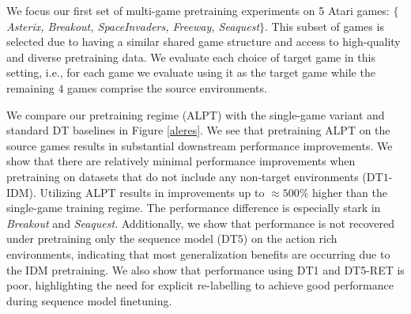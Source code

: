 \documentclass{article} %
\begin{document}



We focus our first set of multi-game pretraining experiments on 5 Atari games: $\{$\emph{Asterix, Breakout, SpaceInvaders, Freeway, Seaquest}$\}$. 
This subset of games is selected due to having a similar shared game structure and access to high-quality and diverse pretraining data.  
We evaluate each choice of target game in this setting, i.e., for each game we evaluate using it as the target game while the remaining $4$ games comprise the source environments.

We compare our pretraining regime (ALPT) with the single-game variant and standard DT baselines in Figure \ref{aleres}. We see that pretraining ALPT on the source games results in substantial downstream performance improvements. We show that there are relatively minimal performance improvements when pretraining on datasets that do not include any non-target environments (DT$1$-IDM). Utilizing ALPT results in improvements up to $\approx 500\%$ higher than the single-game training regime. The performance difference is especially stark in \emph{Breakout} and \emph{Seaquest}. Additionally, we show that performance is not recovered under pretraining only the sequence model (DT$5$) on the action rich environments, indicating that most generalization benefits are occurring due to the IDM pretraining. We also show that performance using DT1 and DT5-RET is poor, highlighting the need for explicit re-labelling to achieve good performance during sequence model finetuning.
\end{document}
